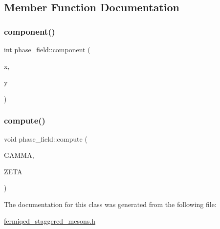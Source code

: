 \subsection{Member Function Documentation}
\mbox{\label{classphase__field_aa4837d1dbdef924550e2c473b8cb7cd0}} 
\subsubsection{\texorpdfstring{component()}{component()}}
{\footnotesize\ttfamily int phase\+\_\+field\+::component (\begin{DoxyParamCaption}\item[{\hyperlink{mdp__compatibility__macros_8h_aa6f1179c424e48adef1cedf7c436eb75}{site}}]{x,  }\item[{\hyperlink{mdp__compatibility__macros_8h_aa6f1179c424e48adef1cedf7c436eb75}{site}}]{y }\end{DoxyParamCaption})\hspace{0.3cm}{\ttfamily [inline]}}

\mbox{\label{classphase__field_a00ef00d8126c1ce8d68b53d67d217902}} 
\subsubsection{\texorpdfstring{compute()}{compute()}}
{\footnotesize\ttfamily void phase\+\_\+field\+::compute (\begin{DoxyParamCaption}\item[{\hyperlink{classmdp__matrix}{mdp\+\_\+matrix}}]{G\+A\+M\+MA,  }\item[{\hyperlink{classmdp__matrix}{mdp\+\_\+matrix}}]{Z\+E\+TA }\end{DoxyParamCaption})\hspace{0.3cm}{\ttfamily [inline]}}



The documentation for this class was generated from the following file\+:\begin{DoxyCompactItemize}
\item 
\hyperlink{fermiqcd__staggered__mesons_8h}{fermiqcd\+\_\+staggered\+\_\+mesons.\+h}\end{DoxyCompactItemize}
